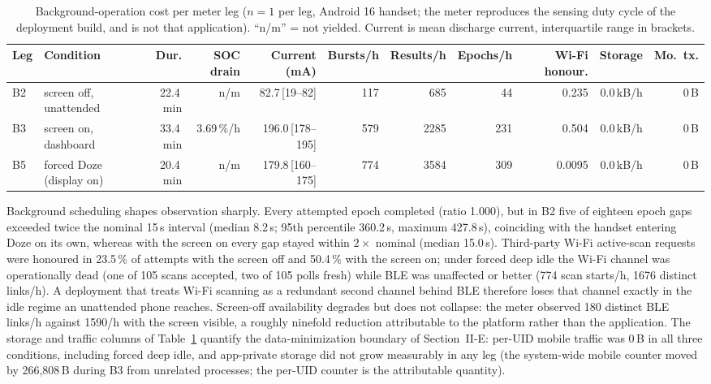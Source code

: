 \documentclass[journal,10pt]{IEEEtran}
\begin{document}
\begin{table}[t]
\centering
\caption{Background-operation cost per meter leg ($n = 1$ per leg, Android 16
handset; the meter reproduces the sensing duty cycle of the deployment build,
and is not that application). ``n/m'' = not yielded. Current is mean discharge
current, interquartile range in brackets.}
\label{tab:cost}
\footnotesize
\setlength{\tabcolsep}{2.5pt}
\begin{tabular}{llrrrrrrrrr}
\toprule
\textbf{Leg} & \textbf{Condition} & \textbf{Dur.} & \textbf{SOC drain} &
\textbf{Current (mA)} & \textbf{Bursts/h} & \textbf{Results/h} &
\textbf{Epochs/h} & \textbf{Wi-Fi honour.} & \textbf{Storage} &
\textbf{Mo.\ tx.} \\
\midrule
B2 & screen off, unattended & 22.4\,min & n/m & 82.7\,[19--82] & 117 & 685 & 44 & 0.235 & 0.0\,kB/h & 0\,B \\
B3 & screen on, dashboard & 33.4\,min & 3.69\,\%/h & 196.0\,[178--195] & 579 & 2285 & 231 & 0.504 & 0.0\,kB/h & 0\,B \\
B5 & forced Doze (display on) & 20.4\,min & n/m & 179.8\,[160--175] & 774 & 3584 & 309 & 0.0095 & 0.0\,kB/h & 0\,B \\
\bottomrule
\end{tabular}
\end{table}

Background scheduling shapes observation sharply. Every attempted epoch
completed (ratio 1.000), but in B2 five of eighteen epoch gaps exceeded twice
the nominal 15\,s interval (median 8.2\,s; 95th percentile 360.2\,s, maximum
427.8\,s), coinciding with the handset entering Doze on its own, whereas with
the screen on every gap stayed within $2\times$ nominal (median 15.0\,s).
Third-party Wi-Fi active-scan requests were honoured in 23.5\,\% of attempts
with the screen off and 50.4\,\% with the screen on; under forced deep idle the
Wi-Fi channel was operationally dead (one of 105 scans accepted, two of 105
polls fresh) while BLE was unaffected or better (774 scan starts/h, 1676
distinct links/h). A deployment that treats Wi-Fi scanning as a redundant
second channel behind BLE therefore loses that channel exactly in the idle
regime an unattended phone reaches. Screen-off availability degrades but does
not collapse: the meter observed 180 distinct BLE links/h against 1590/h with
the screen visible, a roughly ninefold reduction attributable to the platform
rather than the application. The storage and traffic columns of
Table~\ref{tab:cost} quantify the data-minimization boundary of
Section~II-E: per-UID mobile traffic was 0\,B in all three conditions,
including forced deep idle, and app-private storage did not grow measurably in
any leg (the system-wide mobile counter moved by 266{,}808\,B during B3 from
unrelated processes; the per-UID counter is the attributable quantity).
\end{document}
